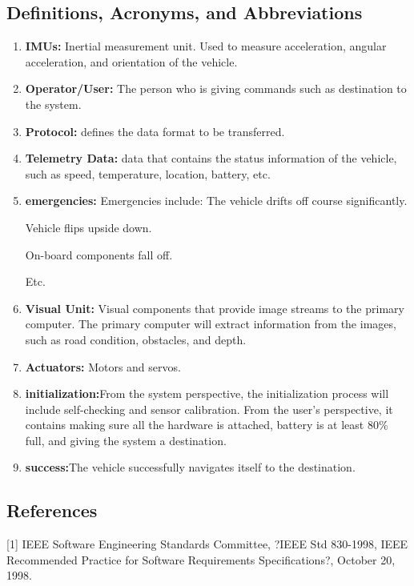 \documentclass[compsoc,draftclsnofoot,onecolumn,10pt]{IEEEtran}
\begin{document}
\subsection{Definitions, Acronyms, and Abbreviations} %
\begin{enumerate}
	\item \textbf{IMUs:} Inertial measurement unit. Used to measure 
acceleration, angular acceleration, and orientation of the vehicle.
	\item \textbf{Operator/User:} The person who is giving commands 
such as destination to the system.
	\item \textbf{Protocol:} defines the data format to be 
transferred.
	\item \textbf{Telemetry Data:} data that contains the status 
information of the vehicle, such as speed, temperature, location, battery, etc.
	\item \textbf{emergencies:} Emergencies include: The vehicle 
drifts off course significantly.\par Vehicle flips upside down.\par On-board 
components fall off.\par Etc.\par
	\item \textbf{Visual Unit:} Visual components that provide 
image streams to the primary computer. The primary computer will extract 
information from the images, such as road condition, obstacles, and depth. 
	\item \textbf{Actuators:} Motors and servos.
	\item \textbf{initialization:}From the system perspective, the initialization
	process will include self-checking and sensor calibration. From the user's 
	perspective, it contains making sure all the hardware is attached, battery is 
	at least 80\% full, and giving the system a destination. 
	\item \textbf{success:}The vehicle successfully navigates itself to the 
	destination.
\end{enumerate}

\subsection{References} %
[1] IEEE Software Engineering Standards Committee, ?IEEE Std 830-1998, IEEE 
Recommended Practice for Software Requirements Specifications?, October 20, 1998.
\end{document}
